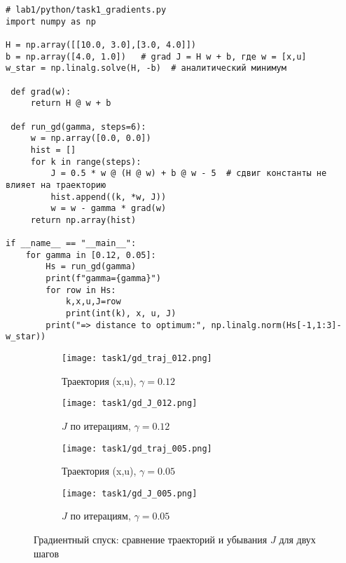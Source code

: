 \begin{lstlisting}[caption={Градиентный спуск: две стратегии шага и первые итерации},label={lst:gd}]
# lab1/python/task1_gradients.py
import numpy as np

H = np.array([[10.0, 3.0],[3.0, 4.0]])
b = np.array([4.0, 1.0])   # grad J = H w + b, где w = [x,u]
w_star = np.linalg.solve(H, -b)  # аналитический минимум

 def grad(w):
     return H @ w + b

 def run_gd(gamma, steps=6):
     w = np.array([0.0, 0.0])
     hist = []
     for k in range(steps):
         J = 0.5 * w @ (H @ w) + b @ w - 5  # сдвиг константы не влияет на траекторию
         hist.append((k, *w, J))
         w = w - gamma * grad(w)
     return np.array(hist)

if __name__ == "__main__":
    for gamma in [0.12, 0.05]:
        Hs = run_gd(gamma)
        print(f"gamma={gamma}")
        for row in Hs:
            k,x,u,J=row
            print(int(k), x, u, J)
        print("=> distance to optimum:", np.linalg.norm(Hs[-1,1:3]-w_star))
\end{lstlisting}

\begin{figure}[H]
    \centering
    \begin{subfigure}{0.48\textwidth}
        \texttt{[image: task1/gd\_traj\_012.png]}
        \caption{Траектория (x,u), $\gamma=0.12$}
    \end{subfigure}\hfill
    \begin{subfigure}{0.48\textwidth}
        \texttt{[image: task1/gd\_J\_012.png]}
        \caption{$J$ по итерациям, $\gamma=0.12$}
    \end{subfigure}

    \vspace{0.5em}

    \begin{subfigure}{0.48\textwidth}
        \texttt{[image: task1/gd\_traj\_005.png]}
        \caption{Траектория (x,u), $\gamma=0.05$}
    \end{subfigure}\hfill
    \begin{subfigure}{0.48\textwidth}
        \texttt{[image: task1/gd\_J\_005.png]}
        \caption{$J$ по итерациям, $\gamma=0.05$}
    \end{subfigure}
    \caption{Градиентный спуск: сравнение траекторий и убывания $J$ для двух шагов}
    \label{fig:gd}
\end{figure}
